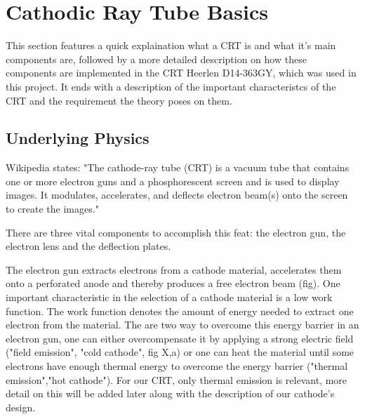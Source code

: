 
\chapter{Cathodic Ray Tube Basics}

This section features a quick explaination what a CRT is and what it's main components are, followed by a more detailed description on how these components are implemented in the CRT Heerlen D14-363GY, which was used in this project. It ends with a description of the important characteristcs of the CRT and the requirement the theory poses on them.

\section{Underlying Physics}

Wikipedia states: "The cathode-ray tube (CRT) is a vacuum tube that contains one or more electron guns and a phosphorescent screen and is used to display images. It modulates, accelerates, and deflects electron beam(s) onto the screen to create the images."

There are three vital components to accomplish this feat: the electron gun, the electron lens and the deflection plates. 

The electron gun extracts electrons from a cathode material, accelerates them onto a perforated anode and thereby produces a free electron beam (fig). One important characteristic in the selection of a cathode material is a low work function. The work function denotes the amount of energy needed to extract one electron from the material. The are two way to overcome this energy barrier in an electron gun, one can either overcompensate it by applying a strong electric field ("field emission", "cold cathode", fig X,a) or one can heat the material until some electrons have enough thermal energy to overcome the energy barrier ("thermal emission","hot cathode"). For our CRT, only thermal emission is relevant, more detail on this will be added later along with the description of our cathode's design. 

